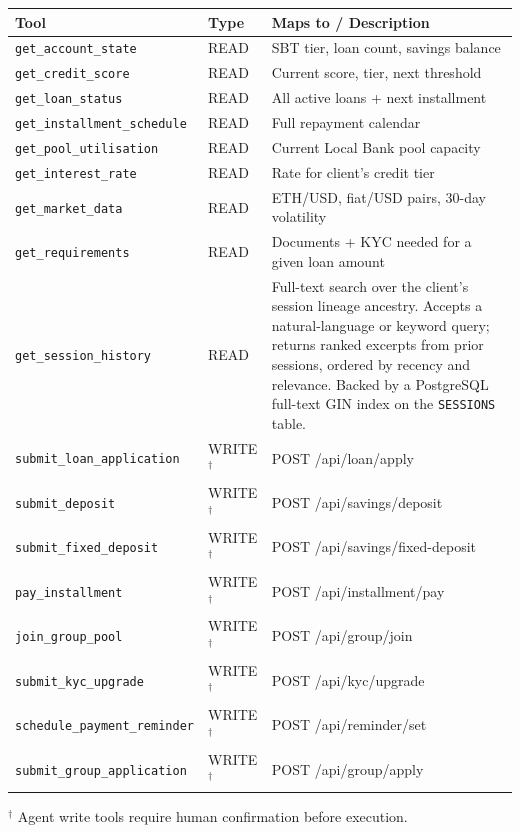 \documentclass[12pt, a4paper]{report}
\newcommand{\tableheadcolor}{\rowcolor{TableHeadBg}}
\begin{document}
\begin{table}[H]
\centering
\begin{tabular}{p{4.8cm}p{1.4cm}p{6.3cm}}
\toprule
\tableheadcolor
\textbf{Tool} & \textbf{Type} & \textbf{Maps to / Description} \\
\midrule
\texttt{get\_account\_state}         & READ & SBT tier, loan count, savings balance \\
\texttt{get\_credit\_score}          & READ & Current score, tier, next threshold \\
\texttt{get\_loan\_status}           & READ & All active loans + next installment \\
\texttt{get\_installment\_schedule}  & READ & Full repayment calendar \\
\texttt{get\_pool\_utilisation}      & READ & Current Local Bank pool capacity \\
\texttt{get\_interest\_rate}         & READ & Rate for client's credit tier \\
\texttt{get\_market\_data}           & READ & ETH/USD, fiat/USD pairs, 30-day volatility \\
\texttt{get\_requirements}           & READ & Documents + KYC needed for a given loan amount \\
\texttt{get\_session\_history}       & READ & Full-text search over the client's session lineage ancestry. Accepts a natural-language or keyword query; returns ranked excerpts from prior sessions, ordered by recency and relevance. Backed by a PostgreSQL full-text GIN index on the \texttt{SESSIONS} table. \\
\texttt{submit\_loan\_application}   & WRITE$^{\dagger}$ & POST /api/loan/apply \\
\texttt{submit\_deposit}             & WRITE$^{\dagger}$ & POST /api/savings/deposit \\
\texttt{submit\_fixed\_deposit}      & WRITE$^{\dagger}$ & POST /api/savings/fixed-deposit \\
\texttt{pay\_installment}            & WRITE$^{\dagger}$ & POST /api/installment/pay \\
\texttt{join\_group\_pool}           & WRITE$^{\dagger}$ & POST /api/group/join \\
\texttt{submit\_kyc\_upgrade}        & WRITE$^{\dagger}$ & POST /api/kyc/upgrade \\
\texttt{schedule\_payment\_reminder} & WRITE$^{\dagger}$ & POST /api/reminder/set \\
\texttt{submit\_group\_application}  & WRITE$^{\dagger}$ & POST /api/group/apply \\
\bottomrule
\end{tabular}

\vspace{4pt}
\noindent\small$^{\dagger}$ Agent write tools require human confirmation before execution.
\end{table}
\end{document}
